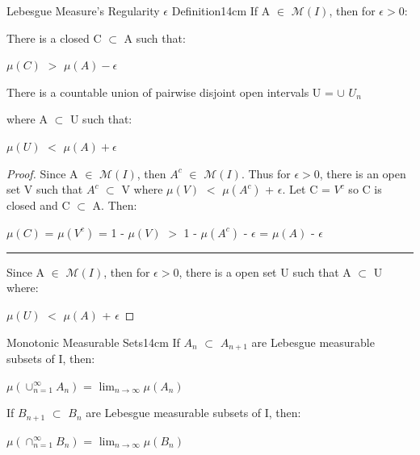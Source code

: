     \vspace{0.5cm}



    \begin{wtheorem}{Lebesgue Measure's Regularity $\epsilon$ Definition}{14cm}
        If A $\in$ $\mathcal{M}(I)$, then for $\epsilon > 0$:

        \hspace{0.5cm}
        There is a closed C $\subset$ A such that:

        \hspace{1cm}
        $\mu(C)$ $>$ $\mu(A) - \epsilon$

        \hspace{0.5cm}
        There is a countable union of pairwise disjoint open
        intervals U = $\cup$ $U_n$
        
        \hspace{0.5cm}
        where A $\subset$ U such that:

        \hspace{1cm}
        $\mu(U)$ $<$ $\mu(A) + \epsilon$
    \end{wtheorem}

    \begin{proof}
        Since A $\in$ $\mathcal{M}(I)$, then $A^c$ $\in$ $\mathcal{M}(I)$.
        Thus for $\epsilon > 0$, there is an open set V such that
        $A^c$ $\subset$ V where $\mu(V)$ $<$ $\mu(A^c)$ + $\epsilon$.
        Let C = $V^c$ so C is closed and C $\subset$ A. Then:

        \hspace{0.5cm}
        $\mu(C)$
        = $\mu(V^c)$
        = 1 - $\mu(V)$
        $>$ 1 - $\mu(A^c)$ - $\epsilon$
        = $\mu(A)$ - $\epsilon$

        \rule[0.1cm]{15.2cm}{0.01cm}

        Since A $\in$ $\mathcal{M}(I)$, then for $\epsilon > 0$,
        there is a open set U such that A $\subset$ U where:

        \hspace{0.5cm}
        $\mu(U)$ $<$ $\mu(A)$ + $\epsilon$
    \end{proof}

    \vspace{0.5cm}



    \begin{wtheorem}{Monotonic Measurable Sets}{14cm}
        If $A_n$ $\subset$ $A_{n+1}$ are Lebesgue measurable subsets of I, then:

        \hspace{0.5cm}
        $\mu(\cup_{n=1}^{\infty} A_n)$
        = $\lim_{n \rightarrow \infty} \mu(A_n)$

        If $B_{n+1}$ $\subset$ $B_n$ are Lebesgue measurable subsets of I, then:

        \hspace{0.5cm}
        $\mu(\cap_{n=1}^{\infty} B_n)$
        = $\lim_{n \rightarrow \infty} \mu(B_n)$
    \end{wtheorem}

